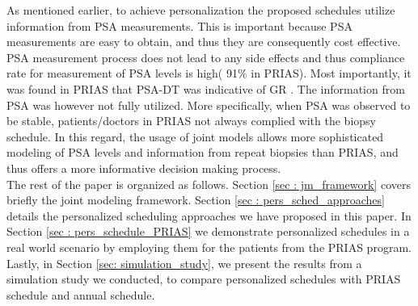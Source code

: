 As mentioned earlier, to achieve personalization the proposed schedules utilize information from PSA measurements. This is important because PSA measurements are easy to obtain, and thus they are consequently cost effective. PSA measurement process does not lead to any side effects and thus compliance rate for measurement of PSA levels is high( 91\% in PRIAS). Most importantly, it was found in PRIAS that PSA-DT was indicative of GR \cite{bokhorst2015compliance}. The information from PSA was however not fully utilized. More specifically, when PSA was observed to be stable, patients/doctors in PRIAS not always complied with the biopsy schedule. In this regard, the usage of joint models allows more sophisticated modeling of PSA levels and information from repeat biopsies than PRIAS, and thus offers a more informative decision making process.\\

The rest of the paper is organized as follows. Section \ref{sec : jm_framework} covers briefly the joint modeling framework. Section \ref{sec : pers_sched_approaches} details the personalized scheduling approaches we have proposed in this paper. In Section \ref{sec : pers_schedule_PRIAS} we demonstrate personalized schedules in a real world scenario by employing them for the patients from the PRIAS program. Lastly, in Section \ref{sec: simulation_study}, we present the results from a simulation study we conducted, to compare personalized schedules with PRIAS schedule and annual schedule.